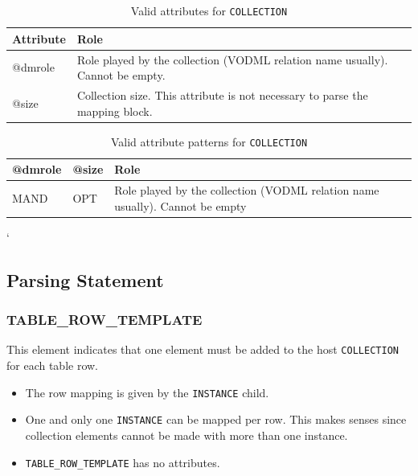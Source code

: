 \documentclass[11pt,a4paper]{ivoa}
\begin{document}
\begin{table}[!htbp]
\small
\centering
\begin{tabulary}{\linewidth}{|L|J|}
       \hline 
           \textbf{Attribute} & 
           \textbf{Role}\\
       \hline  \hline
          @dmrole    & 
           Role played by the collection (VODML relation name usually). Cannot be empty.\\       
       \hline  
          @size    & 
          Collection size. This attribute is not necessary to parse the mapping block.\\       
       \hline 
 \end{tabulary}
 \caption{Valid attributes for  \texttt{COLLECTION}} 
 \label{tbl:att-att}
 \end{table}


\begin{table}[!t]
\small
\centering
\begin{tabulary}{\linewidth}{|L|L|J|}
    \hline 
        @dmrole   & 
        @size   &  
        Role\\
    \hline  \hline
       MAND & 
       OPT & 
       Role played by the collection (VODML relation name usually). Cannot be empty \\    
    \hline 
  \end{tabulary}
  \caption{Valid attribute patterns for  \texttt{COLLECTION}} 
  \label{tbl:coll-pattern}
 \end{table}`
\FloatBarrier

%
%
\subsection{Parsing Statement}

%
%

\subsubsection{TABLE\_ROW\_TEMPLATE}
This element indicates that one element must be added to the host \texttt{COLLECTION} for each table row.

\begin{itemize}
    \item The row mapping is given by the \texttt{INSTANCE} child.
    \item One and only one \texttt{INSTANCE} can be mapped per row. 
             This makes senses since collection elements cannot be made with more than one instance.
   \item \texttt{TABLE\_ROW\_TEMPLATE}  has no attributes.
\end{itemize}
\end{document}

